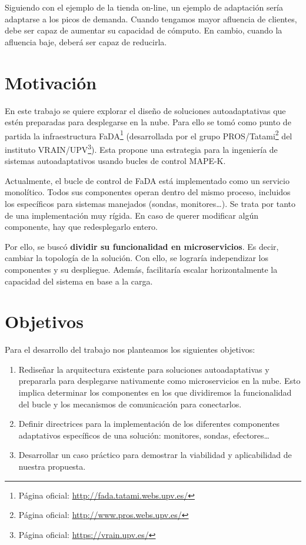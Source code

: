 Siguiendo con el ejemplo de la tienda on-line, un ejemplo de adaptación sería adaptarse a los picos de demanda. Cuando tengamos mayor afluencia de clientes, debe ser capaz de aumentar su capacidad de cómputo. En cambio, cuando la afluencia baje, deberá ser capaz de reducirla.

\section{Motivación}

En este trabajo se quiere explorar el diseño de soluciones autoadaptativas que estén preparadas para desplegarse en la nube. Para ello se tomó como punto de partida la infraestructura FaDA\footnote{Página oficial: \url{http://fada.tatami.webs.upv.es/}} (desarrollada por el grupo PROS/Tatami\footnote{Página oficial: \url{http://www.pros.webs.upv.es/}} del instituto VRAIN/UPV\footnote{Página oficial: \url{https://vrain.upv.es/}}). Esta propone una estrategia para la ingeniería de sistemas autoadaptativos usando bucles de control MAPE-K\cite{ibmcorporationArchitecturalBlueprintAutonomic2006, fonsServiciosAdaptivereadyPara2021}.

Actualmente, el bucle de control de FaDA está implementado como un servicio monolítico. Todos sus componentes operan dentro del mismo proceso, incluidos los específicos para sistemas manejados (sondas, monitores\dots). Se trata por tanto de una implementación muy rígida. En caso de querer modificar algún componente, hay que redesplegarlo entero.

Por ello, se buscó \textbf{dividir su funcionalidad en microservicios}. Es decir, cambiar la topología de la solución. Con ello, se lograría independizar los componentes y su despliegue. Además, facilitaría escalar horizontalmente la capacidad del sistema en base a la carga.

\section{Objetivos}

Para el desarrollo del trabajo nos planteamos los siguientes objetivos:

\begin{enumerate}
  \item Rediseñar la arquitectura existente para soluciones autoadaptativas y prepararla para desplegarse nativamente como microservicios en la nube. Esto implica determinar los componentes en los que dividiremos la funcionalidad del bucle y los mecanismos de comunicación para conectarlos.

  \item Definir directrices para la implementación de los diferentes componentes adaptativos específicos de una solución: monitores, sondas, efectores\dots

  \item Desarrollar un caso práctico para demostrar la viabilidad y aplicabilidad de nuestra propuesta.
\end{enumerate}


